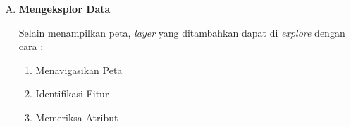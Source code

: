 \begin{enumerate}[A.]
\begin{enumerate}[1.]
  \item Setelah memilih \textit{shapefile} yang diinginkan untuk dilihat atau diubah, klik \textit{Open} untuk memasukkan \textit{path file} ke dalam \textit{form} isian, dan klik \textit{Open} lagi pada dialog \textit{Add Vector Layer} untuk memuatnya ke dalam aplikasi. Seharusnya akan terlihat pada \textit{map canvas} seperti tampilan pada gambar \ref{fig:petaindonesiaload}
  
\begin{figure}[H]
  \centering
  \texttt{[image: ./resources/008-peta-indonesia]}
  \caption{Peta Indonesia Yang Sudah Termuat Dalam \textit{Map Canvas}}
  \label{fig:petaindonesiaload}
\end{figure}

\end{enumerate}

\item \textbf{Mengeksplor Data}

Selain menampilkan peta, \textit{layer} yang ditambahkan dapat di \textit{explore} dengan cara :

\begin{enumerate}[1.]
  \item Menavigasikan Peta
  \item Identifikasi Fitur
  \item Memeriksa Atribut
  
\end{enumerate}

\end{enumerate}